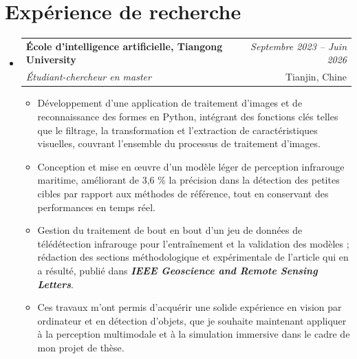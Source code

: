 \documentclass[a4paper,11pt]{article}
\makeatletter
\newcommand{\resumeSubheading}[4]{
\vspace{0.5mm}\item
    \begin{tabular*}{0.98\textwidth}[t]{l@{\extracolsep{\fill}}r}
        \textbf{#1} & \textit{\footnotesize{#4}} \\
        \textit{\footnotesize{#3}} &  \footnotesize{#2}\\
    \end{tabular*}
    \vspace{-2.4mm}
}
\newcommand{\resumeSubHeadingListStart}{\begin{itemize}[leftmargin=*,labelsep=0mm]}
\newcommand{\resumeItemListStart}{\begin{justify}\begin{itemize}[leftmargin=3ex, rightmargin=2ex, noitemsep,labelsep=1.2mm,itemsep=0mm]\small}
\newcommand{\resumeSubHeadingListEnd}{\end{itemize}\vspace{0.5mm}}
\newcommand{\resumeItemListEnd}{\end{itemize}\end{justify}\vspace{-4mm}}
\makeatother
\begin{document}
\section{\textbf{Expérience de recherche}}
\resumeSubHeadingListStart
    \resumeSubheading
        {École d'intelligence artificielle, Tiangong University}
        {Tianjin, Chine}
        {Étudiant-chercheur en master}{Septembre 2023 -- Juin 2026}
        \resumeItemListStart
        
        \item Développement d'une application de traitement d'images et de reconnaissance des formes en Python, intégrant des fonctions clés telles que le filtrage, la transformation et l'extraction de caractéristiques visuelles, couvrant l'ensemble du processus de traitement d'images.
        
        \item Conception et mise en œuvre d'un modèle léger de perception infrarouge maritime, améliorant de 3,6 \% la précision dans la détection des petites cibles par rapport aux méthodes de référence, tout en conservant des performances en temps réel.
        
        \item Gestion du traitement de bout en bout d'un jeu de données de télédétection infrarouge pour l'entraînement et la validation des modèles ; rédaction des sections méthodologique et expérimentale de l'article qui en a résulté, publié dans \textit{\textbf{IEEE Geoscience and Remote Sensing Letters}}.

        \item Ces travaux m'ont permis d'acquérir une solide expérience en vision par ordinateur et en détection d'objets, que je souhaite maintenant appliquer à la perception multimodale et à la simulation immersive dans le cadre de mon projet de thèse.
        \resumeItemListEnd
\resumeSubHeadingListEnd


\end{document}

